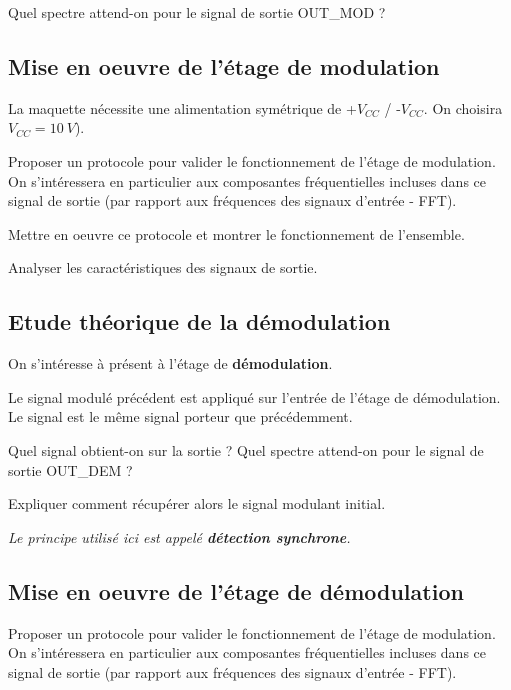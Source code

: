 \documentclass[a4paper,11pt]{article}
\begin{document}
\Real Quel spectre attend-on pour le signal de sortie OUT\_MOD ?


\subsection*{Mise en oeuvre de l'étage de modulation}

La maquette nécessite une alimentation symétrique de +$V_{CC}$ / -$V_{CC}$. On choisira $V_{CC} = 10~V$).

\medskip

\Real Proposer un protocole pour valider le fonctionnement de l'étage de modulation. On s'intéressera en particulier aux composantes fréquentielles incluses dans ce signal de sortie (par rapport aux fréquences des signaux d'entrée - FFT).

\Real Mettre en oeuvre ce protocole et montrer le fonctionnement de l'ensemble.

\Real Analyser les caractéristiques des signaux de sortie.


\subsection*{Etude théorique de la démodulation}

On s'intéresse à présent à l'étage de \textbf{démodulation}.

Le signal modulé précédent est appliqué sur l'entrée  de l'étage de démodulation. Le signal  est le même signal porteur que précédemment.

\Real Quel signal obtient-on sur la sortie  ? Quel spectre attend-on pour le signal de sortie OUT\_DEM ?

\Real Expliquer comment récupérer alors le signal modulant initial.

\textit{Le principe utilisé ici est appelé \textbf{détection synchrone}.}


\subsection*{Mise en oeuvre de l'étage de démodulation}

\Real Proposer un protocole pour valider le fonctionnement de l'étage de modulation. On s'intéressera en particulier aux composantes fréquentielles incluses dans ce signal de sortie (par rapport aux fréquences des signaux d'entrée - FFT).
\end{document}
